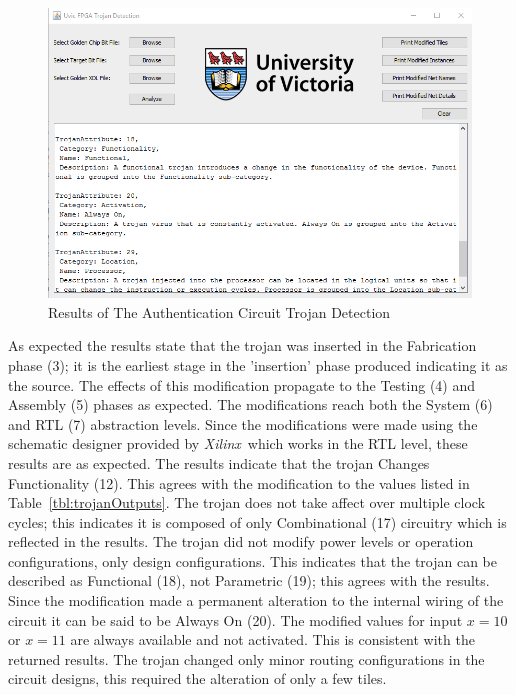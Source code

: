 \documentclass[conference]{IEEEtran}
\newcommand{\Xilinx}{\textit{\gls{Xilinx}}~}
\begin{document}
\begin{figure}[h]
	\centering
	\includegraphics[width=1\linewidth]{Figures/backDoorResult}
	\caption[Results of The Authentication Circuit Trojan Detection]{Results of The Authentication Circuit Trojan Detection}
	\label{fig:backDoorResult}
\end{figure}
As expected the results state that the trojan was inserted in the Fabrication phase (3); it is the earliest stage in the 'insertion' phase produced indicating it as the source.
The effects of this modification propagate to the Testing (4) and Assembly (5) phases as expected.
The modifications reach both the System (6) and \acrfull{RTL} (7) abstraction levels.
Since the modifications were made using the schematic designer provided by \Xilinx which works in the \acrshort{RTL} level, these results are as expected.
The results indicate that the trojan Changes Functionality (12). 
This agrees with the modification to the values listed in Table~\ref{tbl:trojanOutputs}.
The trojan does not take affect over multiple clock cycles; this indicates it is composed of only Combinational (17) circuitry which is reflected in the results.
The trojan did not modify power levels or operation configurations, only design configurations.
This indicates that the trojan can be described as Functional (18), not Parametric (19); this agrees with the results.
Since the modification made a permanent alteration to the internal wiring of the circuit it can be said to be Always On (20).
The modified values for input $x=10$ or $x=11$ are always available and not activated.
This is consistent with the returned results.
The trojan changed only minor routing configurations in the circuit designs, this required the alteration of only a few tiles.
\end{document}
